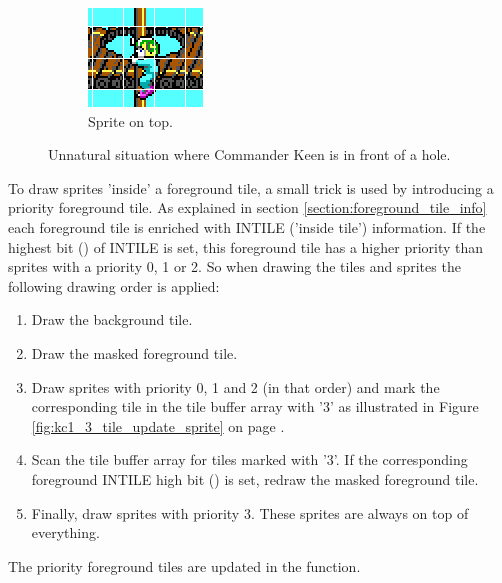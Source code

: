 \documentclass[book.tex]{subfiles}
\begin{document}
\begin{figure}[H]
\begin{subfigure}{.25\textwidth}
  \includegraphics[width=.9\textwidth]{screenshots_300dpi/game/tile_composite_3.png}
  \caption{Sprite on top.}
\end{subfigure}
\caption{Unnatural situation where Commander Keen is in front of a hole.}
\label{fig:draw_layers}
\end{figure}
\par

To draw sprites 'inside' a foreground tile, a small trick is used by introducing a priority foreground tile. As explained in section \ref{section:foreground_tile_info} each foreground tile is enriched with INTILE ('inside tile') information. If the highest bit () of INTILE is set, this foreground tile has a higher priority than sprites with a priority 0, 1 or 2. So when drawing the tiles and sprites the following drawing order is applied:
\begin{enumerate}
  \item Draw the background tile.
  \item Draw the masked foreground tile.
  \item Draw sprites with priority 0, 1 and 2 (in that order) and mark the corresponding tile in the tile buffer array with '3' as illustrated in Figure \ref{fig:kc1_3_tile_update_sprite} on page \pageref{fig:kc1_3_tile_update_sprite}.
  \item Scan the tile buffer array for tiles marked with '3'. If the corresponding foreground INTILE high bit () is set, redraw the masked foreground tile.
  \item Finally, draw sprites with priority 3. These sprites are always on top of everything.
\end{enumerate}
\par
The priority foreground tiles are updated in the  function.\\
\end{document}
